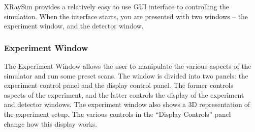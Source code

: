 \documentclass{article}
\begin{document}

XRaySim provides a relatively easy to use GUI interface to controlling
the simulation.  When the interface starts, you are presented with
two windows -- the experiment window, and the detector window.  


\subsubsection{Experiment Window}

The Experiment Window allows the user to manipulate the various
aspects of the simulator and run some preset scans.  The window is
divided into two panels: the experiment control panel and the display
control panel.  The former controls aspects of the experiment, and the
latter controls the display of the experiment and detector windows.
The experiment window also shows a 3D representation of the experiment
setup.  The various controls in the ``Display Controls'' panel change
how this display works.
\end{document}
